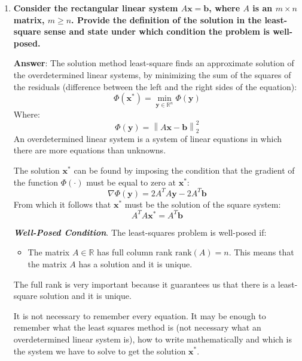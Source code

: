 \begin{enumerate}[label=\textcolor{Green3}{\textbf{\arabic*.}}]
    \item \textcolor{Green3}{\textbf{%
        Consider the rectangular linear system $A\mathbf{x} = \mathbf{b}$, where $A$ is an $m \times n$ matrix, $m \ge n$. Provide the definition of the solution in the least-square sense and state under which condition the problem is well-posed.%
    }}

    \textbf{Answer}: The solution method least-square finds an approximate solution of the overdetermined linear systems, by minimizing the sum of the squares of the residuals (difference between the left and the right sides of the equation):
    \begin{equation*}
        \Phi\left(\mathbf{x}^{*}\right) = \min_{\mathbf{y} \in \mathbb{R}^{n}}\Phi\left(\mathbf{y}\right)
    \end{equation*}
    Where:
    \begin{equation*}
        \Phi\left(\mathbf{y}\right) = \left\|A\mathbf{x} - \mathbf{b}\right\|_{2}^{2}
    \end{equation*}
    An overdetermined linear system is a system of linear equations in which there are more equations than unknowns.

    The solution $\mathbf{x}^{*}$ can be found by imposing the condition that the gradient of the function $\Phi\left(\cdot\right)$ must be equal to zero at $\mathbf{x}^{*}$:
    \begin{equation*}
        \nabla \Phi\left(\mathbf{y}\right) = 2A^{T}A\mathbf{y} - 2A^{T}\mathbf{b}
    \end{equation*}
    From which it follows that $\mathbf{x}^{*}$ must be the solution of the square system:
    \begin{equation*}
        A^{T} A \mathbf{x}^{*} = A^{T} \mathbf{b}
    \end{equation*}
    
    \emph{\textbf{Well-Posed Condition}}. The least-squares problem is well-posed if:
    \begin{itemize}
        \item The matrix $A \in \mathbb{R}$ has full column rank $\mathrm{rank}\left(A\right) = n$. This means that the matrix $A$ has a solution and it is unique.
    \end{itemize}
    The full rank is very important because it guarantees us that there is a least-square solution and it is unique.

    \begin{tipbox}
        It is not necessary to remember every equation. It may be enough to remember what the least squares method is (not necessary what an overdetermined linear system is), how to write mathematically and which is the system we have to solve to get the solution $\mathbf{x}^{*}$.


\end{tipbox}
\end{enumerate}
